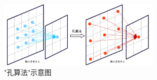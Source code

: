 \begin{figure}[h]
	\centering
	\includegraphics[width=0.7\textwidth]{demo_images/illustration/hole.pdf}
	\caption{"孔算法"示意图}
\end{figure}